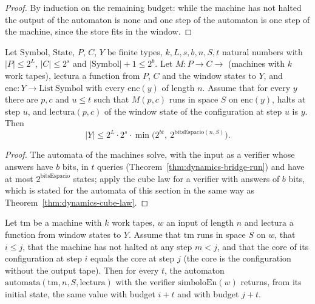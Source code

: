 \begin{proof}
  \leanok
  By induction on the remaining budget: while the machine has not halted the output of the
  automaton is $\mathrm{none}$ and one step of the automaton is one step of the machine, since the
  store fits in the window.
\end{proof}

\begin{theorem}
  \label{thm:dynamics-cube-machines}
  \leanok
  Let $\mathrm{Symbol}$, $\mathrm{State}$, $P$, $C$, $Y$ be finite types, $k, L, s, b, n, S, t$
  natural numbers with $|P| \le 2^L$, $|C| \le 2^s$ and $|\mathrm{Symbol}| + 1 \le 2^b$. Let
  $M : P \to C \to$ (machines with $k$ work tapes), $\mathrm{lectura}$ a function from
  $P$, $C$ and the window states to $Y$, and $\mathrm{enc} : Y \to \mathrm{List}\ \mathrm{Symbol}$
  with every $\mathrm{enc}(y)$ of length $n$. Assume that for every $y$ there are $p, c$ and
  $u \le t$ such that $M(p,c)$ runs in space $S$ on $\mathrm{enc}(y)$, halts at step $u$, and
  $\mathrm{lectura}(p, c)$ of the window state of the configuration at step $u$ is $y$. Then
  \[
    |Y| \le 2^L \cdot 2^s \cdot \min\bigl(2^{b t},\ 2^{\mathrm{bitsEspacio}(n, S)}\bigr).
  \]
  \own{}
\end{theorem}

\begin{proof}
  \leanok
  The automata of the machines solve, with the input as a verifier whose answers have $b$ bits, in
  $t$ queries (Theorem~\ref{thm:dynamics-bridge-run}) and have at most $2^{\mathrm{bitsEspacio}}$
  states; apply the cube law for a verifier with answers of $b$ bits, which is stated for the
  automata of this section in the same way as Theorem~\ref{thm:dynamics-cube-law}.
\end{proof}

\begin{theorem}
  \label{thm:dynamics-no-time-machine}
  \leanok
  Let $\mathrm{tm}$ be a machine with $k$ work tapes, $w$ an input of length $n$ and
  $\mathrm{lectura}$ a function from window states to $Y$. Assume that $\mathrm{tm}$ runs in space
  $S$ on $w$, that $i \le j$, that the machine has not halted at any step $m < j$, and that the core
  of its configuration at step $i$ equals the core at step $j$ (the core is the configuration
  without the output tape). Then for every $t$, the automaton
  $\mathrm{automata}(\mathrm{tm}, n, S, \mathrm{lectura})$ with the verifier $\mathrm{simboloEn}(w)$
  returns, from its initial state, the same value with budget $i + t$ and with budget $j + t$.
  \own{}
\end{theorem}

